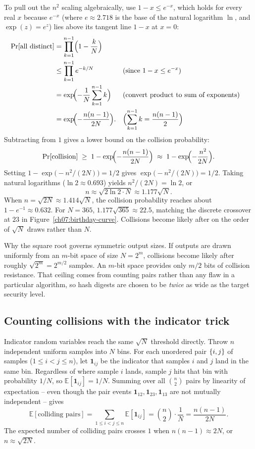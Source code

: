 To pull out the $n^2$ scaling algebraically, use $1 - x \le e^{-x}$, which holds for every real $x$ because $e^{-x}$ (where $e \approx 2.718$ is the base of the natural logarithm $\ln$, and $\exp(z) = e^z$) lies above its tangent line $1 - x$ at $x = 0$:
\begin{align*}
  \Pr[\text{all distinct}]
    &= \prod_{k=1}^{n-1}\Bigl(1 - \frac{k}{N}\Bigr) \\
    &\le \prod_{k=1}^{n-1} e^{-k/N} && \text{(since $1 - x \le e^{-x}$)} \\
    &= \exp\!\Bigl(-\frac{1}{N}\sum_{k=1}^{n-1} k\Bigr) && \text{(convert product to sum of exponents)} \\
    &= \exp\!\Bigl(-\frac{n(n-1)}{2N}\Bigr). && \Bigl(\sum_{k=1}^{n-1} k = \frac{n(n-1)}{2}\Bigr)
\end{align*}
Subtracting from $1$ gives a lower bound on the collision probability:
\[
  \Pr[\text{collision}] \;\ge\; 1 - \exp\!\Bigl(-\frac{n(n-1)}{2N}\Bigr) \;\approx\; 1 - \exp\!\Bigl(-\frac{n^2}{2N}\Bigr).
\]
Setting $1 - \exp\bigl(-n^2/(2N)\bigr) = 1/2$ gives $\exp\bigl(-n^2/(2N)\bigr) = 1/2$. Taking natural logarithms ($\ln 2 \approx 0.693$) yields $n^2/(2N) = \ln 2$, or
\[
  \boxed{\,n \approx \sqrt{2\ln 2 \cdot N} \approx 1.177\sqrt{N}.\,}
\]
When $n = \sqrt{2N} \approx 1.414\sqrt{N}$, the collision probability reaches about $1 - e^{-1} \approx 0.632$. For $N = 365$, $1.177\sqrt{365} \approx 22.5$, matching the discrete crossover at $23$ in Figure~\ref{ch07:birthday-curve}. Collisions become likely after on the order of $\sqrt{N}$ draws rather than $N$.

\begin{whybox}
Why the square root governs symmetric output sizes. If outputs are drawn uniformly from an $m$-bit space of size $N = 2^m$, collisions become likely after roughly $\sqrt{2^m} = 2^{m/2}$ samples. An $m$-bit space provides only $m/2$ bits of collision resistance. That ceiling comes from counting pairs rather than any flaw in a particular algorithm, so hash digests are chosen to be \emph{twice} as wide as the target security level.
\end{whybox}

\subsection{Counting collisions with the indicator trick}

Indicator random variables reach the same $\sqrt{N}$ threshold directly. Throw $n$ independent uniform samples into $N$ bins. For each unordered pair $\{i, j\}$ of samples ($1 \le i < j \le n$), let $\mathbf{1}_{ij}$ be the indicator that samples $i$ and $j$ land in the same bin. Regardless of where sample $i$ lands, sample $j$ hits that bin with probability $1/N$, so $\mathbb{E}[\mathbf{1}_{ij}] = 1/N$. Summing over all $\binom{n}{2}$ pairs by linearity of expectation -- even though the pair events $\mathbf{1}_{12}, \mathbf{1}_{23}, \mathbf{1}_{13}$ are not mutually independent -- gives
\[
  \mathbb{E}[\text{colliding pairs}] = \sum_{1 \le i < j \le n} \mathbb{E}[\mathbf{1}_{ij}] = \binom{n}{2}\cdot\frac{1}{N} = \frac{n(n-1)}{2N}.
\]
The expected number of colliding pairs crosses $1$ when $n(n-1) \approx 2N$, or $n \approx \sqrt{2N}$.

